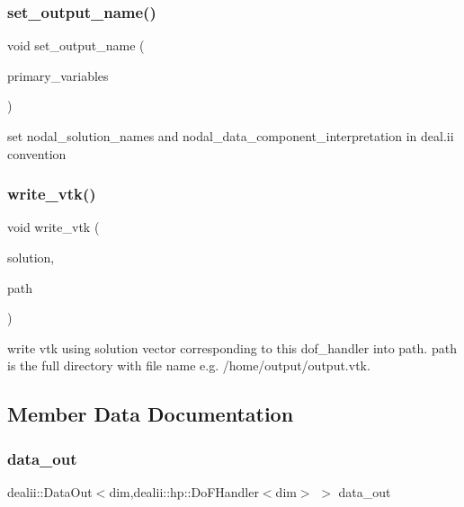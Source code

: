 \subsubsection{\texorpdfstring{set\_output\_name()}{set\_output\_name()}}
{\footnotesize\ttfamily void set\+\_\+output\+\_\+name (\begin{DoxyParamCaption}\item[{std\+::vector$<$ std\+::vector$<$ std\+::string $>$ $>$}]{primary\+\_\+variables }\end{DoxyParamCaption})}

set nodal\+\_\+solution\+\_\+names and nodal\+\_\+data\+\_\+component\+\_\+interpretation in deal.\+ii convention \mbox{\label{class_f_e_mdata_a62d54e01135c4ab0b58f51441732dca3}} 
\subsubsection{\texorpdfstring{write\_vtk()}{write\_vtk()}}
{\footnotesize\ttfamily void write\+\_\+vtk (\begin{DoxyParamCaption}\item[{vector\+Type \&}]{solution,  }\item[{std\+::string}]{path }\end{DoxyParamCaption})}

write vtk using solution vector corresponding to this dof\+\_\+handler into path. path is the full directory with file name e.\+g. \textquotesingle{}/home/output/output.vtk\textquotesingle{}. 

\subsection{Member Data Documentation}
\mbox{\label{class_f_e_mdata_ab8d2ee01f13a0a7b7d2dd50edabbe8b6}} 
\subsubsection{\texorpdfstring{data\_out}{data\_out}}
{\footnotesize\ttfamily dealii\+::\+Data\+Out$<$dim,dealii\+::hp\+::\+Do\+F\+Handler$<$dim$>$ $>$ data\+\_\+out}

\mbox{\label{class_f_e_mdata_a38887e3bbeaa16b46355ba99d22e8063}} 
